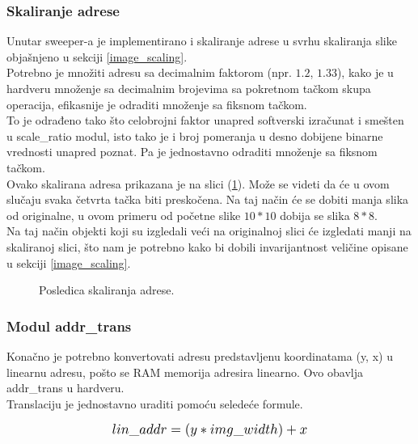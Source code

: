 \newpage

\subsubsection{Skaliranje adrese}\label{address_scaling_sec}

Unutar sweeper-a je implementirano i skaliranje adrese u svrhu skaliranja slike
objašnjeno u sekciji \ref{image_scaling}. \\
Potrebno je množiti adresu sa decimalnim faktorom (npr. $1.2$, $1.33$), kako je
u hardveru množenje sa decimalnim brojevima sa pokretnom tačkom skupa operacija,
efikasnije je odraditi množenje sa fiksnom tačkom. \\
To je odrađeno tako što celobrojni faktor unapred softverski izračunat i smešten
u scale\_ratio modul, isto tako je i broj pomeranja u desno dobijene binarne
vrednosti unapred poznat.
Pa je jednostavno odraditi množenje sa fiksnom tačkom. \\

Ovako skalirana adresa prikazana je na slici (\ref{hop_sweep_scale}).
Može se videti da će u ovom slučaju svaka četvrta tačka biti preskočena.
Na taj način će se dobiti manja slika od originalne, u ovom primeru od početne
slike $10*10$ dobija se slika $8*8$. \\
Na taj način objekti koji su izgledali veći na originalnoj slici će izgledati
manji na skaliranoj slici, što nam je potrebno kako bi dobili invarijantnost
veličine opisane u sekciji \ref{image_scaling}.

\begin{figure}[H]
  \centering
  \scalebox{0.7}{
    
    }
\caption{Posledica skaliranja adrese.}
\label{hop_sweep_scale}
\end{figure}

\subsubsection{Modul addr\_trans}\label{addr_trans_sec}

Konačno je potrebno konvertovati adresu predstavljenu koordinatama (y, x) u
linearnu adresu, pošto se RAM memorija adresira linearno. Ovo obavlja
addr\_trans u hardveru. \\
Translaciju je jednostavno uraditi pomoću seledeće formule.

\begin{equation}
  \Scale[1.2]{lin\_addr = (y * img\_width) + x}
  \label{IntegralImage_eq2}
\end{equation}

